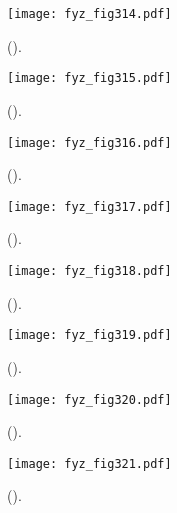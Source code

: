 {  \begin{figure}[ht!]  %
    \centering
    \texttt{[image: fyz\_fig314.pdf]}
    \caption{
             (\cite[s.~148]{Feynman02}).}
    \label{fyz:fig314}
  \end{figure}

  \begin{figure}[ht!]  %
    \centering
    \texttt{[image: fyz\_fig315.pdf]}
    \caption{
             (\cite[s.~148]{Feynman02}).}
    \label{fyz:fig315}
  \end{figure}

  \begin{figure}[ht!]  %
    \centering
    \texttt{[image: fyz\_fig316.pdf]}
    \caption{
             (\cite[s.~148]{Feynman02}).}
    \label{fyz:fig316}
  \end{figure}
  
  \begin{figure}[ht!]  %
    \centering
    \texttt{[image: fyz\_fig317.pdf]}
    \caption{
             (\cite[s.~148]{Feynman02}).}
    \label{fyz:fig317}
  \end{figure}

  \begin{figure}[ht!]  %
    \centering
    \texttt{[image: fyz\_fig318.pdf]}
    \caption{
             (\cite[s.~148]{Feynman02}).}
    \label{fyz:fig318}
  \end{figure}

  \begin{figure}[ht!]  %
    \centering
    \texttt{[image: fyz\_fig319.pdf]}
    \caption{
             (\cite[s.~148]{Feynman02}).}
    \label{fyz:fig319}
  \end{figure}

  \begin{figure}[ht!]  %
    \centering
    \texttt{[image: fyz\_fig320.pdf]}
    \caption{
             (\cite[s.~148]{Feynman02}).}
    \label{fyz:fig320}
  \end{figure}

  \begin{figure}[ht!]  %
    \centering
    \texttt{[image: fyz\_fig321.pdf]}
    \caption{
             (\cite[s.~148]{Feynman02}).}
    \label{fyz:fig321}
  \end{figure}

}
